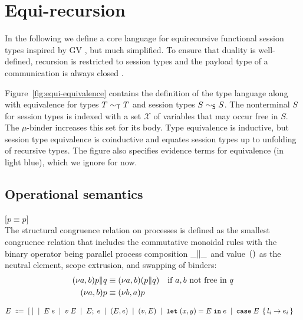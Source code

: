 \section{Equi-recursion}
\label{sec:equi-recursion}


In the following we define a core language for equirecursive
functional session types inspired by GV
\cite{DBLP:journals/jfp/GayV10}, but much simplified. To ensure that
duality is well-defined,
recursion is restricted to session types and the payload type of a
communication is always closed \cite{DBLP:journals/corr/abs-2004-01322}.

Figure~\ref{fig:equi-equivalence} contains the definition of the type
language along with equivalence for types $T \sim_{\mathsf T} T$  and session
types $S \sim_{\mathsf S} S$. The nonterminal $S$ for session types is indexed with a set
$\mathcal X$ of variables that may occur free in $S$. The $\mu$-binder
increases this set for its body.
Type equivalence is inductive, but session type
equivalence is coinductive and equates 
session types up to unfolding of recursive types. The figure also
specifies evidence terms for equivalence (in light blue), which we ignore for now.



\subsection{Operational semantics}

[$p \equiv p$]\medskip\\
The structural congruence relation on processes is defined as the smallest
congruence relation that includes the commutative monoidal rules with the
binary operator being parallel process composition $\PPar \_ \_$ and
value~$()$ as the neutral element, scope extrusion, and swapping
of binders:
\begin{align*}
  \PPar{\PScope p}{q} &\equiv \PScope (\PPar p q)
  \quad\text{if $a,b$ not free in $q$}
  \\
  \PScope p &\equiv \PScope[b,a] p
\end{align*}

\begin{align*}
  E \; \Coloneqq \;\;&
    [\;] \; \mid \;
    E \; e \; \mid \;
    v \; E \; \mid \;
    E;\; e \; \mid \;
    (E,e) \; \mid \;
    (v,E) \; \mid \;
    \mathtt{let}\; (x,y) = E \;\mathtt{in}\; e \; \mid \;
    \mathtt{case}\; E \; \left\{\,  l_i \rightarrow e_i  \,\right\}
\end{align*}

